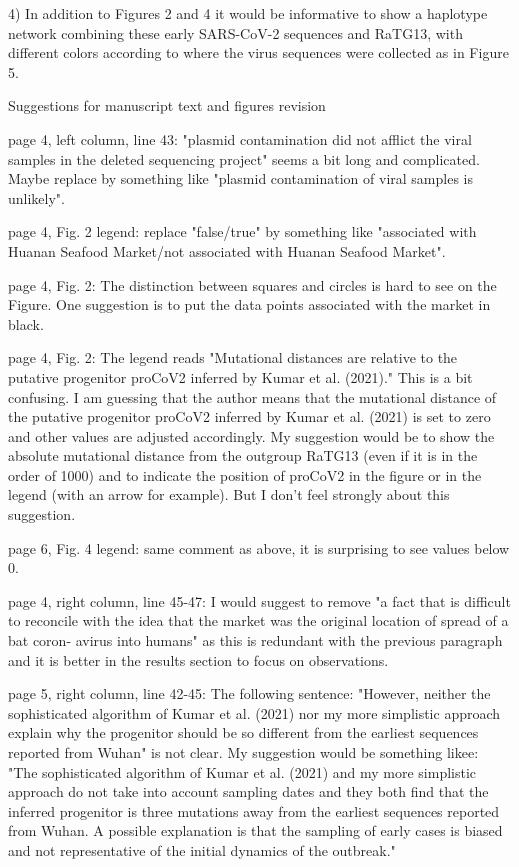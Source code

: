 \documentclass[11pt, oneside]{article}   	%
\begin{document}
4) In addition to Figures 2 and 4 it would be informative to show a haplotype network combining these early SARS-CoV-2 sequences and RaTG13, with different colors according to where the virus sequences were collected as in Figure 5.


Suggestions for manuscript text and figures revision

page 4, left column, line 43: "plasmid contamination did not afflict the viral samples in the deleted sequencing project" seems a bit long and complicated. Maybe replace by something like "plasmid contamination of viral samples is unlikely".

page 4, Fig. 2 legend: replace "false/true" by something like "associated with Huanan Seafood Market/not associated with Huanan Seafood Market".

page 4, Fig. 2: The distinction between squares and circles is hard to see on the Figure. One suggestion is to put the data points associated with the market in black.

page 4, Fig. 2: The legend reads "Mutational distances are relative to the putative progenitor proCoV2 inferred by Kumar et al. (2021)." This is a bit confusing. I am guessing that the author means that the mutational distance of the putative progenitor proCoV2 inferred by Kumar et al. (2021) is set to zero and other values are adjusted accordingly. My suggestion would be to show the absolute mutational distance from the outgroup RaTG13 (even if it is in the order of 1000) and to indicate the position of proCoV2 in the figure or in the legend (with an arrow for example). But I don't feel strongly about this suggestion.

page 6, Fig. 4 legend: same comment as above, it is surprising to see values below 0. 

page 4, right column, line 45-47: I would suggest to remove "a fact that is difficult to reconcile with the idea that the market was the original location of spread of a bat coron- avirus into humans" as this is redundant with the previous paragraph and it is better in the results section to focus on observations.

page 5, right column, line 42-45: The following sentence: "However, neither the sophisticated algorithm of Kumar et al. (2021) nor my more simplistic approach explain why the progenitor should be so different from the earliest sequences reported from Wuhan" is not clear. My suggestion would be something likee: "The sophisticated algorithm of Kumar et al. (2021) and my more simplistic approach do not take into account sampling dates and they both find that the inferred progenitor is three mutations away from the earliest sequences reported from Wuhan. A possible explanation is that the sampling of early cases is biased and not representative of the initial dynamics of the outbreak."
\end{document}
